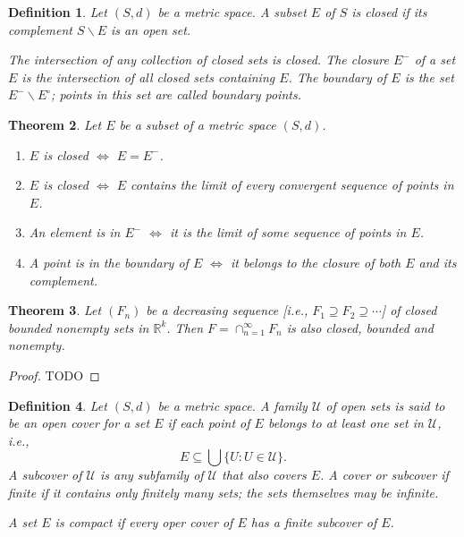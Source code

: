 \documentclass[12pt, lettersize]{book}
\newtheorem{thm}{Theorem}[section]
\newtheorem{dfn}[thm]{Definition}
\begin{document}
	\begin{dfn}
		Let $(S,d)$ be a metric space. A subset $E$ of $S$ is \emph{closed} if its complement $S\backslash E$ is an open set.
		
		The intersection of any collection of closed sets is closed. The \emph{closure} $E^-$ of a set $E$ is the intersection of all closed sets containing $E$.
		The \emph{boundary} of $E$ is the set $E^-\backslash E^\circ$; points in this set are called \emph{boundary points}.
	\end{dfn}
	\begin{thm}
		Let $E$ be a subset of a metric space $(S,d)$.
		\begin{enumerate}
			\item $E$ is closed $\iff$ $E=E^-$.
			\item $E$ is closed $\iff$ $E$ contains the limit of every convergent sequence of points in $E$.
			\item An element is in $E^-$ $\iff$ it is the limit of some sequence of points in $E$.
			\item A point is in the boundary of $E$ $\iff$ it belongs to the closure of both $E$ and its complement.
		\end{enumerate}
	\end{thm}
	
	\begin{thm}
		Let $(F_n)$ be a decreasing sequence [i.e., $F_1\supseteq F_2\supseteq\cdots$] of closed bounded nonempty sets in $\mathbb{R}^k$. Then $F=\cap_{n=1}^\infty F_n$ is also closed, bounded and nonempty.
	\end{thm}
	\begin{proof}
		TODO
	\end{proof}
	
	\begin{dfn}
		Let $(S,d)$ be a metric space. A family $\mathcal{U}$ of open sets is said to be an \emph{open cover} for a set
		$E$ if each point of $E$ belongs to at least one set in $\mathcal{U}$, i.e.,
		\begin{displaymath}
			E\subseteq\bigcup\{U:U\in\mathcal{U}\}.
		\end{displaymath}
		A \emph{subcover} of $\mathcal{U}$ is any subfamily of $\mathcal{U}$ that also covers $E$. A cover or subcover
		if \emph{finite} if it contains only finitely many sets; the sets themselves may be infinite.
		
		A set $E$ is \emph{compact} if every oper cover of $E$ has a finite subcover of $E$.
	\end{dfn}
	
\end{document}
